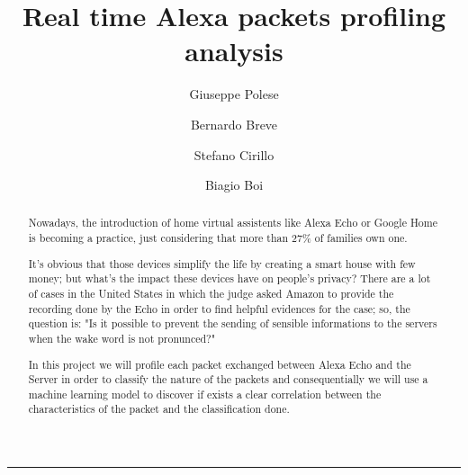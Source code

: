 \documentclass[sigconf]{acmart}
\begin{document}
    \title{Real time Alexa packets profiling analysis}


    \author{Giuseppe Polese}

    \author{Bernardo Breve}
    \author{Stefano Cirillo}

    \author{Biagio Boi}

    \begin{abstract}
        Nowadays, the introduction of home virtual assistents like Alexa Echo or Google Home is becoming a practice, just considering that more than 27\% of families own one.

        It's obvious that those devices simplify the life by creating a smart house with few money; but what's the impact these devices have on people's privacy?
        There are a lot of cases in the United States in which the judge asked Amazon to provide the recording done by the Echo in order to find helpful
        evidences for the case; so, the question is: "Is it possible to prevent the sending of sensible informations to the servers when the wake word is not pronunced?"

        In this project we will profile each packet exchanged between Alexa Echo and the Server in order to classify the nature of the packets and consequentially we will use a machine learning model to discover if exists a clear correlation between the characteristics of the packet and the classification done.
    \end{abstract}



    \begin{teaserfigure}
        \rule{\linewidth}{1mm}
    \end{teaserfigure}
\end{document}
